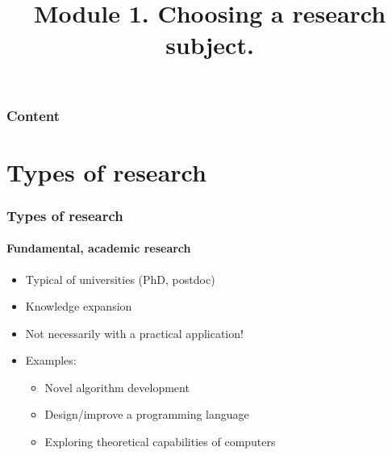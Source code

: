 \documentclass[aspectratio=169]{beamer}
\title{Module 1. Choosing a research subject.}
\subtitle{\coursename}
\author{\lecturers}   %
\date{\academicyear}
\begin{document}
    
    
    \begin{frame}
        \maketitle
    \end{frame}
    
    \begin{frame}
        \frametitle{Content}
        
        \tableofcontents
    \end{frame}
    
    \section{Types of research}
    
    \begin{frame}
        \frametitle{Types of research}
        \framesubtitle{Fundamental, academic research}
        
        \begin{itemize}
            \item Typical of universities (PhD, postdoc)
            \item Knowledge expansion
            \item Not necessarily with a practical application!
            \item Examples:
            \begin{itemize}
                \item Novel algorithm development
                \item Design/improve a programming language
                \item Exploring theoretical capabilities of computers
            \end{itemize}
        \end{itemize}
        
    \end{frame}
    
\end{document}
